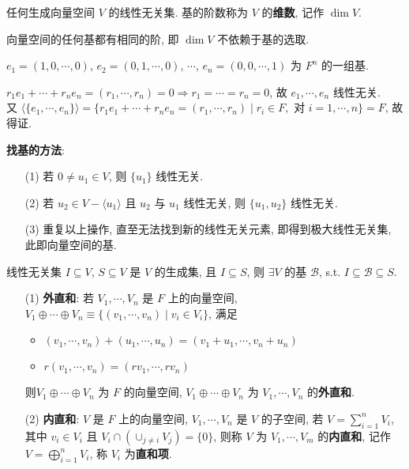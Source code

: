 \documentclass{note}
\begin{document}
\begin{df}[基]
    任何生成向量空间 $V$ 的线性无关集. 基的阶数称为 $V$ 的\textbf{维数}, 记作 $\dim V$.
\end{df}

\begin{thm}[(课本定理 1.12)]
    向量空间的任何基都有相同的阶, 即 $\dim V$ 不依赖于基的选取.
\end{thm}

\begin{eg}
    $e_1=(1,0,\cdots,0)$, $e_2=(0,1,\cdots,0)$, $\cdots$, $e_n=(0,0,\cdots,1)$ 为 $F^n$ 的一组基.
\end{eg}
\begin{pf}
    $r_1e_1+\cdots+r_ne_n=(r_1,\cdots,r_n)=0\Longrightarrow r_1=\cdots=r_n=0$, 故 $e_1,\cdots,e_n$ 线性无关.\\
    又 $\langle\{e_1,\cdots,e_n\}\rangle=\{r_1e_1+\cdots+r_ne_n=(r_1,\cdots,r_n)\mid r_i\in F,\text{ 对 }i=1,\cdots,n\}=F$, 故得证.
\end{pf}

\textbf{找基的方法}:
\begin{itemize}
    \item[(1)] 若 $0\neq u_1\in V$, 则 $\{u_1\}$ 线性无关.
    \item[(2)] 若 $u_2\in V-\langle u_1\rangle$ 且 $u_2$ 与 $u_1$ 线性无关, 则 $\{u_1,u_2\}$ 线性无关.
    \item[(3)] 重复以上操作, 直至无法找到新的线性无关元素, 即得到极大线性无关集, 此即向量空间的基.
\end{itemize}

\begin{thm}[(课本定理 1.9)]
    线性无关集 $I\subseteq V$, $S\subseteq V$ 是 $V$ 的生成集, 且 $I\subseteq S$, 则 $\exists V$ 的基 $\mathcal{B}$, s.t. $I\subseteq\mathcal{B}\subseteq S$.
\end{thm}

\begin{df}[直和]
    \begin{itemize}
        \item[(1)] \textbf{外直和}: 若 $V_1,\cdots,V_n$ 是 $F$ 上的向量空间, $V_1\oplus\cdots\oplus V_n\equiv\{(v_1,\cdots,v_n)\mid v_i\in V_i\}$, 满足
        \begin{itemize}
            \item $(v_1,\cdots,v_n)+(u_1,\cdots,u_n)=(v_1+u_1,\cdots,v_n+u_n)$
            \item $r(v_1,\cdots,v_n)=(rv_1,\cdots,rv_n)$
        \end{itemize}
        则$V_1\oplus\cdots\oplus V_n$ 为 $F$ 的向量空间, $V_1\oplus\cdots\oplus V_n$ 为 $V_1,\cdots,V_n$ 的\textbf{外直和}.
        \item[(2)] \textbf{内直和}: $V$ 是 $F$ 上的向量空间, $V_1,\cdots,V_n$ 是 $V$ 的子空间, 若 $V=\sum_{i=1}^nV_i$, 其中 $v_i\in V_i$ 且 $V_i\cap(\cup_{j\neq i}V_j)=\{0\}$, 则称 $V$ 为 $V_1,\cdots,V_m$ 的\textbf{内直和}, 记作 $V=\bigoplus_{i=1}^nV_i$, 称 $V_i$ 为\textbf{直和项}.
    \end{itemize}
\end{df}
\end{document}
